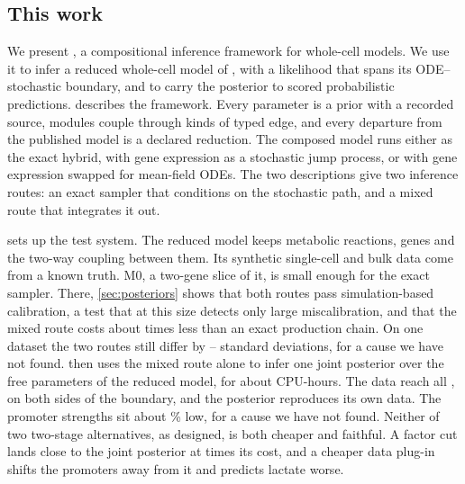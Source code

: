 \subsection{This work}

We present \IC{}, a compositional inference framework for whole-cell models. We use it
to infer a reduced whole-cell model of \syn{}, with a likelihood that spans its ODE--stochastic
boundary, and to carry the posterior to scored probabilistic predictions.
 describes the framework. Every parameter is a prior with a recorded
source, modules couple through  kinds of typed edge, and every departure
from the published model is a declared reduction. The composed model runs either as the
exact hybrid, with gene expression as a stochastic jump process, or with gene expression
swapped for mean-field ODEs. The two descriptions give two inference
routes: an exact sampler that conditions on the stochastic path, and a mixed route that
integrates it out.

 sets up the test system. The reduced \syn{} model keeps
 metabolic reactions,  genes and the two-way coupling between
them. Its synthetic single-cell and bulk data come from a known truth. M0, a two-gene
slice of it, is small enough for the exact sampler. There, \cref{sec:posteriors} shows that
both routes pass simulation-based calibration, a test that at this size detects only large
miscalibration, and that the mixed route costs about  times less than an exact
production chain. On one dataset the two routes still differ by
-- standard deviations, for a cause we have not found.  then uses the mixed route
alone to infer one joint posterior over the  free parameters of the
reduced model, for about  CPU-hours. The data reach all ,
on both sides of the boundary, and the posterior reproduces its own data. The promoter
strengths sit about \% low, for a cause we have not found.
Neither of two
two-stage alternatives, as designed, is both cheaper and faithful. A factor cut lands close to
the joint posterior at  times its cost, and a cheaper data plug-in shifts the
promoters away from it and predicts lactate worse.

